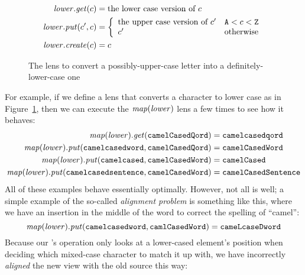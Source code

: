 \begin{figure}
    \begin{align*}
        \mathit{lower}.\mathit{get}(c) &= \mbox{the lower case version of $c$} \\
        \mathit{lower}.\mathit{put}(c',c) &= \left\{\begin{array}{ll}
            \mbox{the upper case version of $c'$} & \mathtt{A} < c < \mathtt{Z} \\
            c' & \mbox{otherwise}
        \end{array}\right. \\
        \mathit{lower}.\mathit{create}(c) &= c
    \end{align*}
    \caption{The \tolower lens to convert a possibly-upper-case letter into
    a definitely-lower-case one}
    \label{fig:tolower-lens}
\end{figure}
For example, if we define a lens \tolower that converts a character to lower
case as in Figure~\ref{fig:tolower-lens}, then we can execute the
$\mathit{map}(\mathit{lower})$ lens a few times to see how it behaves:
\begin{align*}
    \mathit{map}(\mathit{lower}).\mathit{get}(\mathtt{camelCasedQord})
        &= \mathtt{camelcasedqord} \\
    \mathit{map}(\mathit{lower}).\mathit{put}(\mathtt{camelcasedword},\mathtt{camelCasedQord})
        &= \mathtt{camelCasedWord} \\
    \mathit{map}(\mathit{lower}).\mathit{put}(\mathtt{camelcased},\mathtt{camelCasedWord})
        &= \mathtt{camelCased} \\
    \mathit{map}(\mathit{lower}).\mathit{put}(\mathtt{camelcasedsentence},\mathtt{camelCasedWord})
        &= \mathtt{camelCasedSentence}
\end{align*}
All of these examples behave essentially optimally. However, not all is
well; a simple example of the so-called \emph{alignment problem} is
something like this, where we have an insertion in the middle of the word to
correct the spelling of ``camel'':
\[\mathit{map}(\mathit{lower}).\mathit{put}(\mathtt{camelcasedword},\mathtt{camlCasedWord})
    = \mathtt{cameLcaseDword}\]
Because our \map's \PUT operation only looks at a lower-cased element's
position when deciding which mixed-case character to match it up with, we
have incorrectly \emph{aligned} the new view with the old source this way:

\begin{center}
\end{center}

